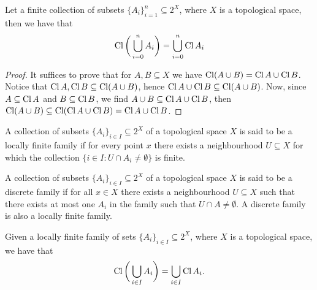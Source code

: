\begin{proposition}\label{prop: finite union of closures}
Let a finite collection of subsets \(\{A_i\}_{i = 1}^n \subseteq 2^X\), where
\(X\) is a topological space, then we have that
\[
  \operatorname{Cl}\bigg(\bigcup_{i = 0}^n A_i\bigg) = \bigcup_{i = 0}^n \operatorname{Cl} A_i
\]
\end{proposition}

\begin{proof}
It suffices to prove that for \(A, B \subseteq X\) we have \(\operatorname{Cl}(A \cup
B) = \operatorname{Cl} A \cup \operatorname{Cl} B\). Notice that \(\operatorname{Cl} A,
\operatorname{Cl} B \subseteq \operatorname{Cl}(A \cup B)\), hence \(\operatorname{Cl} A \cup
\operatorname{Cl} B \subseteq \operatorname{Cl}(A \cup B)\). Now, since \(A \subseteq
\operatorname{Cl} A\) and \(B \subseteq \operatorname{Cl} B\), we find \(A \cup B \subseteq
\operatorname{Cl} A \cup \operatorname{Cl} B\), then \(\operatorname{Cl}(A \cup B) \subseteq
\operatorname{Cl}(\operatorname{Cl} A \cup \operatorname{Cl} B) = \operatorname{Cl} A \cup \operatorname{Cl} B\).
\end{proof}

\begin{definition}
A collection of subsets \(\{A_i\}_{i \in I} \subseteq 2^X\) of a topological
space \(X\) is said to be a locally finite family if for every point \(x\)
there exists a neighbourhood \(U \subseteq X\) for which the collection \(\{i
\in I \colon U \cap A_i \neq \emptyset\}\) is finite.
\end{definition}

\begin{definition}
A collection of subsets \(\{A_i\}_{i \in I} \subseteq 2^X\) of a topological
space \(X\) is said to be a discrete family if for all \(x \in X\) there
exists a neighbourhood \(U \subseteq X\) such that there exists at most one
\(A_i\) in the family such that \(U \cap A \neq \emptyset\). A discrete family
is also a locally finite family.
\end{definition}

\begin{proposition}
Given a locally finite family of sets \(\{A_i\}_{i \in I} \subseteq 2^X\),
where \(X\) is a topological space, we have that
\[
\operatorname{Cl}\bigg(\bigcup_{i \in  I} A_i\bigg) = \bigcup_{i \in  I} \operatorname{Cl} A_i.
\]
\end{proposition}

